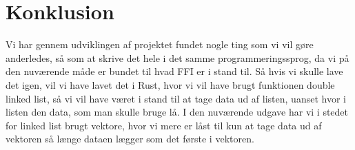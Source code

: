 \documentclass[a4paper, 12pt]{article}
\begin{document}
\section{Konklusion}
Vi har gennem udviklingen af projektet fundet nogle ting som vi vil gøre anderledes, så som at skrive det hele i det samme programmeringssprog, da vi på den nuværende måde er bundet til hvad FFI er i stand til. Så hvis vi skulle lave det igen, vil vi have lavet det i Rust, hvor vi vil have brugt funktionen double linked list, så vi vil have været i stand til at tage data ud af listen, uanset hvor i listen den data, som man skulle bruge lå. I den nuværende udgave har vi i stedet for linked list brugt vektore, hvor vi mere er låst til kun at tage data ud af vektoren så længe dataen lægger som det første i vektoren.

\bigbreak



\vfill
\pagebreak
\end{document}

